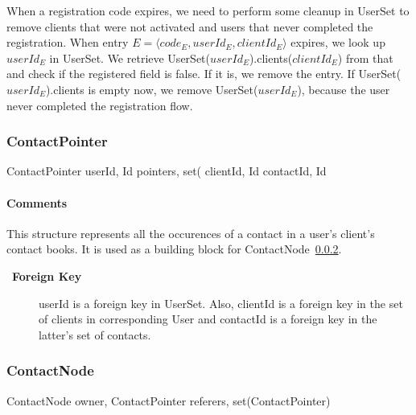 \documentclass[a4paper,10pt]{article}
\let\Item\item
\newcommand\SpecialItem{\renewcommand\item[1][]{\Item[\textbullet~\bfseries##1]}
}
\begin{document}
When a registration code expires, we need to perform some cleanup in UserSet to remove clients that were not activated and users that never completed the registration. When entry 
$E=\langle code_E,userId_E,clientId_E\rangle$ expires, we look up $userId_E$ in UserSet. We retrieve UserSet($userId_E$).clients($clientId_E$) from that and check if the 
registered field is false. If it is, we remove the entry. If UserSet($userId_E$).clients is empty now, we remove UserSet($userId_E$), because the user never completed the 
registration flow.

\subsubsection{ContactPointer}

\begin{verbbox}
ContactPointer
{
  userId, Id
  pointers, set({
    clientId, Id
    contactId, Id
    }
}
\end{verbbox}
\begin{center}
\theverbbox
\end{center}

\begin{inparaitem}[ ]
 \item \infrastructure
\end{inparaitem}

\paragraph*{Comments}
This structure represents all the occurences of a contact in a user's client's contact books. It is used as a building block for 
ContactNode~\ref{sec:structure:server:contact_node}.

\SpecialItem
\begin{description}
 \item[Foreign Key] userId is a foreign key in UserSet. Also, clientId is a foreign key in the set of clients in corresponding User and contactId is a foreign key in the latter's 
set of contacts.
\end{description}

\subsubsection{ContactNode}
\label{sec:structure:server:contact_node}

\begin{verbbox}
ContactNode
{
  owner, ContactPointer
  referers, set(ContactPointer)
}
\end{verbbox}
\begin{center}
\theverbbox
\end{center}
\end{document}
